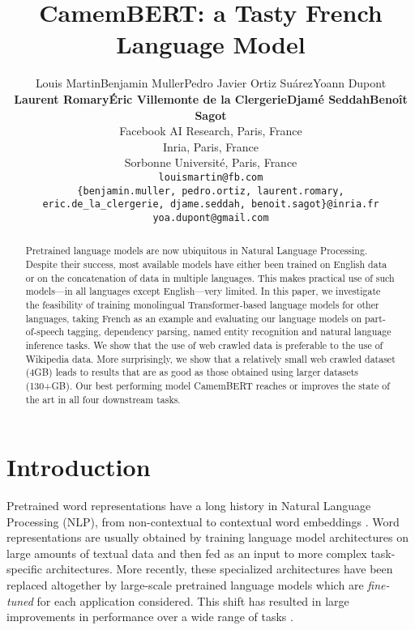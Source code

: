 \documentclass[11pt,a4paper]{article}
\title{CamemBERT: a Tasty French Language Model}
\author{Louis Martin\quad Benjamin Muller\quad Pedro Javier Ortiz Su\'arez\quad Yoann Dupont\\ \large\textbf{Laurent Romary\quad \'Eric Villemonte de la Clergerie\quad Djam\'e Seddah\quad Beno\^it Sagot}\\
  Facebook AI Research, Paris, France \\
  Inria, Paris, France \\
  Sorbonne Universit\'e, Paris, France\\
  \texttt{louismartin@fb.com}\\
  \texttt{\{benjamin.muller, pedro.ortiz, laurent.romary,}\\
  \texttt{eric.de\_la\_clergerie, djame.seddah, benoit.sagot\}@inria.fr}\\ 
  \texttt{yoa.dupont@gmail.com}}
\date{}
\newcommand{\camembert}{CamemBERT\xspace}
\begin{document}
\maketitle



\begin{abstract}


Pretrained language models are now ubiquitous in Natural Language Processing. 
Despite their success, most available models have either been trained on English data or on the concatenation of data in multiple languages. This makes practical use of such models---in all languages except English---very limited. In this paper, we investigate the feasibility of training monolingual Transformer-based language models for other languages, taking French as an example and evaluating our language models on part-of-speech tagging, dependency parsing, named entity recognition and natural language inference tasks. We show that the use of web crawled data is preferable to the use of Wikipedia data. More surprisingly, we show that a relatively small web crawled dataset (4GB) leads to results that are as good as those obtained using larger datasets (130+GB). Our best performing model \camembert reaches or improves the state of the art in all four downstream tasks. 

\end{abstract}

\renewcommand{\thefootnote}{\fnsymbol{footnote}}
\renewcommand{\thefootnote}{\arabic{footnote}}

\section{Introduction}

Pretrained word representations have a long history in Natural Language Processing (NLP), from non-contextual \cite{brown1992class,ando2005framework,mikolov2013distributed,pennington2014glove} to contextual word embeddings \cite{peters2018deep,akbik2018contextual}.
Word representations are usually obtained by training language model architectures on large amounts of textual data and then fed as an input to more complex task-specific architectures.
More recently, these specialized architectures have been replaced altogether by large-scale pretrained language models which are {\em fine-tuned} for each application considered.
This shift has resulted in large improvements in performance over a wide range of tasks \cite{devlin2019bert,radford2019language,liu2019roberta,raffel2019exploring}.
\end{document}
